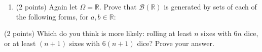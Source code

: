 \documentclass[11pt,a4paper]{article}
\begin{document}
\begin{problem}
\begin{enumerate}[start=5]
$\mathcal B(\mathbb R)=\sigma(\widetilde{\mathcal O})$?
\item (2 points) Again let $\Omega=\mathbb R$. Prove that $\mathcal B(\mathbb R)$
is generated by sets of each of the following forms, for $a,b\in\mathbb R$:
\begin{enumeratea}
\item $(a,b)$;
\item $[a,b]$;
\item $(a,b]$;
\item $(a,\infty)$;
\item $[a,\infty)$.
\end{enumeratea}
\end{enumerate}
\end{problem}
\begin{problem}
(2 points) Which do you think is more likely: rolling at least $n$ sixes with
$6n$ dice, or at least $(n+1)$ sixes with $6(n+1)$ dice? Prove your answer.
\end{problem}
\end{document}
